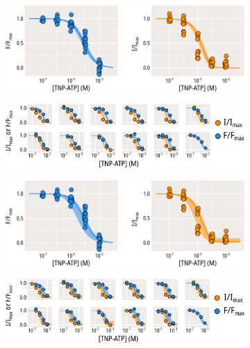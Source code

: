 \begin{figure}[hbtp]
	\centering
	\begin{subfigure}[t]{0.45\textwidth}
		\caption{}\label{ch4fig:w311_mwc_fit_1}
		\centering
		\includegraphics[width=\textwidth]{w311_mwc_fit_1.pdf}
	\end{subfigure}
	\hfill
	\begin{subfigure}[t]{0.45\textwidth}
		\caption{}\label{ch4fig:w311_mwc_fit_2}
		\centering
		\includegraphics[width=\textwidth]{w311_mwc_fit_2.pdf}
	\end{subfigure}
	\vfill
	\begin{subfigure}[t]{0.45\textwidth}
		\caption{}\label{ch4fig:w311_single_fit_1}
		\centering
		\includegraphics[width=\textwidth]{w311_single_fit_1.pdf}
	\end{subfigure}
	\hfill
	\begin{subfigure}[t]{0.45\textwidth}
		\caption{}\label{ch4fig:w311_single_fit_2}
		\centering
		\includegraphics[width=\textwidth]{w311_single_fit_2.pdf}

\end{subfigure}
\end{figure}
